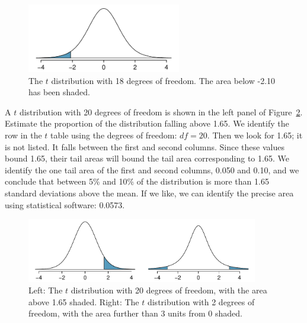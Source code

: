 \vspace{-0.50cm}
\begin{figure}[H]
\centering
\includegraphics[width=0.60\textwidth]{05/figures/tDistDF18LeftTail2Point10/tDistDF18LeftTail2Point10}
\caption{The $t$ distribution with 18 degrees of freedom. The area below -2.10 has been shaded.}
\label{tDistDF18LeftTail2Point10}
\end{figure}


\begin{example}{A $t$ distribution with 20 degrees of freedom is shown in the left panel of Figure~\ref{tDistDF20RightTail1Point65}. Estimate the proportion of the distribution falling above 1.65.}
We identify the row in the $t$ table using the degrees of freedom: $df=20$. Then we look for 1.65; it is not listed. It falls between the first and second columns. Since these values bound 1.65, their tail areas will bound the tail area corresponding to 1.65. We identify the one tail area of the first and second columns, 0.050 and 0.10, and we conclude that between 5\% and 10\% of the distribution is more than 1.65 standard deviations above the mean. If we like, we can identify the precise area using statistical software: 0.0573.
\end{example}

\begin{figure}[H]
\centering
\includegraphics[width=0.90\textwidth]{05/figures/tDistDF20RightTail1Point65/tDistDF20RightTail1Point65}
\caption{Left: The $t$ distribution with 20 degrees of freedom, with the area above 1.65 shaded. Right: The $t$ distribution with 2 degrees of freedom, with the area further than 3 units from 0 shaded.}
\label{tDistDF20RightTail1Point65}
\end{figure}

